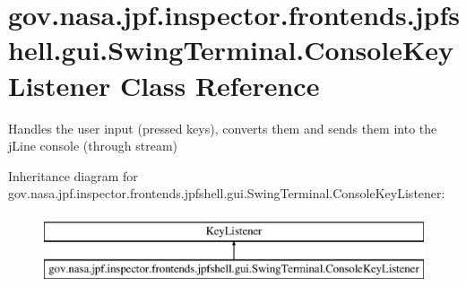 \hypertarget{classgov_1_1nasa_1_1jpf_1_1inspector_1_1frontends_1_1jpfshell_1_1gui_1_1_swing_terminal_1_1_console_key_listener}{}\section{gov.\+nasa.\+jpf.\+inspector.\+frontends.\+jpfshell.\+gui.\+Swing\+Terminal.\+Console\+Key\+Listener Class Reference}
\label{classgov_1_1nasa_1_1jpf_1_1inspector_1_1frontends_1_1jpfshell_1_1gui_1_1_swing_terminal_1_1_console_key_listener}


Handles the user input (pressed keys), converts them and sends them into the j\+Line console (through stream)  


Inheritance diagram for gov.\+nasa.\+jpf.\+inspector.\+frontends.\+jpfshell.\+gui.\+Swing\+Terminal.\+Console\+Key\+Listener\+:\begin{figure}[H]
\begin{center}
\leavevmode
\includegraphics[height=2.000000cm]{classgov_1_1nasa_1_1jpf_1_1inspector_1_1frontends_1_1jpfshell_1_1gui_1_1_swing_terminal_1_1_console_key_listener}
\end{center}
\end{figure}
